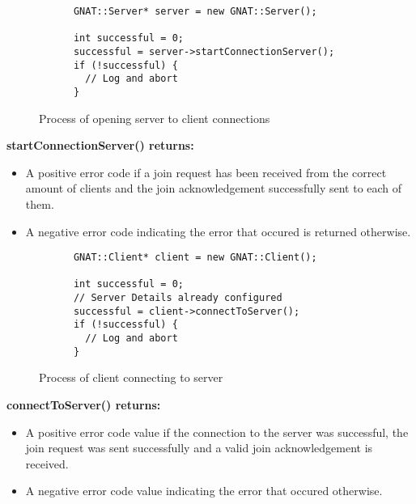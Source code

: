 \begin{figure}[!h]
  \centering
  \begin{lstlisting}
      GNAT::Server* server = new GNAT::Server();

      int successful = 0;
      successful = server->startConnectionServer();
      if (!successful) {
        // Log and abort
      }
  \end{lstlisting}
  \caption{Process of opening server to client connections}
  \label{code:server_conn}
\end{figure}
\textbf{startConnectionServer() returns:}
\begin{itemize}
\item A positive error code if a join request has been received from the correct amount of clients and the join acknowledgement successfully sent to each of them.

\item A negative error code indicating the error that occured is returned otherwise.
\end{itemize}


\begin{figure}[!h]
  \centering
  \begin{lstlisting}
      GNAT::Client* client = new GNAT::Client();

      int successful = 0;
      // Server Details already configured
      successful = client->connectToServer();
      if (!successful) {
        // Log and abort
      }
  \end{lstlisting}
  \caption{Process of client connecting to server}
  \label{code:client_conn}
\end{figure}

\textbf{connectToServer() returns:}
\begin{itemize}
\item A positive error code value if the connection to the server was successful, the join request was sent successfully and a valid join acknowledgement is received.

\item A negative error code value indicating the error that occured otherwise.
\end{itemize}
